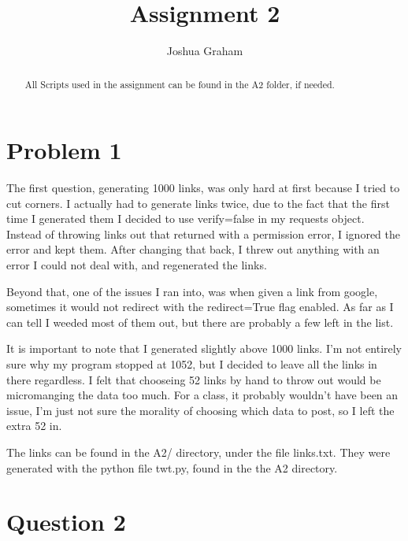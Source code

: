 \documentclass{article}
\begin{document}
\title{Assignment 2}
\author{Joshua Graham}

\maketitle
\pagebreak
\begin{abstract}
All Scripts used in the assignment can be found in the A2 folder, if needed.

\end{abstract}

\section{Problem 1}
	The first question, generating 1000 links, was only hard at first because I tried to cut corners. I actually had to generate links twice, due to the fact that the first time I generated them I decided to use verify=false in my requests object. Instead of throwing links out that returned with a permission error, I ignored the error and kept them. After changing that back, I threw out anything with an error I could not deal with, and regenerated the links.

Beyond that, one of the issues I ran into, was when given a link from google, sometimes it would not redirect with the redirect=True flag enabled. As far as I can tell I weeded most of them out, but there are probably a few left in the list.

It is important to note that I generated slightly above 1000 links. I'm not entirely sure why my program stopped at 1052, but I decided to leave all the links in there regardless. I felt that chooseing 52 links by hand to throw out would be micromanging the data too much. For a class, it probably wouldn't have been an issue, I'm just not sure the morality of choosing which data to post, so I left the extra 52 in.

The links can be found in the A2/ directory, under the file links.txt. They were generated with the python file twt.py, found in the the A2 directory.
\pagebreak
\section{Question 2}
\end{document}
